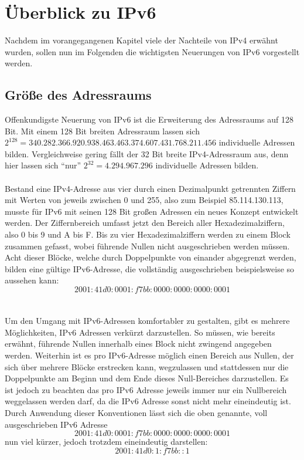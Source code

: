 \documentclass[a4paper,12pt]{scrartcl}
\begin{document}
\section{\"Uberblick zu IPv6}
Nachdem im vorangegangenen Kapitel viele der Nachteile von IPv4 erwähnt wurden, sollen nun im Folgenden die wichtigsten Neuerungen von IPv6 vorgestellt werden. 

\subsection{Gr\"o{\ss}e  des Adressraums}

Offenkundigste Neuerung von IPv6 ist die Erweiterung des Adressraums auf 128 Bit. Mit einem 128 Bit breiten Adressraum lassen sich \\
$2^{128} = 340.282.366.920.938.463.463.374.607.431.768.211.456$ individuelle Adressen bilden. Vergleichweise gering fällt der 32 Bit breite IPv4-Adressraum aus, denn hier lassen sich "`nur"' $2^{32} = 4.294.967.296$ individuelle Adressen bilden. \\
\\
Bestand eine IPv4-Adresse aus vier durch einen Dezimalpunkt getrennten Ziffern mit Werten von jeweils zwischen 0 und 255, also zum Beispiel 85.114.130.113, musste für IPv6 mit seinen 128 Bit großen Adressen ein neues Konzept entwickelt werden.
Der Ziffernbereich umfasst jetzt den Bereich aller Hexadezimalziffern, also 0 bis 9 und A bis F. Bis zu vier Hexadezimalziffern werden zu einem Block zusammen gefasst, wobei führende Nullen nicht ausgeschrieben werden m\"ussen. Acht dieser Blöcke, welche durch Doppelpunkte von einander abgegrenzt werden, bilden eine gültige IPv6-Adresse, die vollständig ausgeschrieben  beispielsweise so aussehen kann:  \[ 2001:41d0:0001:f7bb:0000:0000:0000:0001 \]\\
\\
Um den Umgang mit IPv6-Adressen komfortabler zu gestalten, gibt es mehrere Möglichkeiten, IPv6 Adressen verkürzt darzustellen. So müssen, wie bereits erwähnt, führende Nullen innerhalb eines Block nicht zwingend angegeben werden. Weiterhin ist es pro IPv6-Adresse möglich einen Bereich aus Nullen, der sich über mehrere Blöcke erstrecken kann, wegzulassen und stattdessen nur die Doppelpunkte am Beginn und dem Ende dieses Null-Bereiches darzustellen. Es ist jedoch zu beachten das pro IPv6 Adresse jeweils immer nur ein Nullbereich weggelassen werden darf, da die IPv6 Adresse sonst nicht mehr eineindeutig ist. Durch Anwendung dieser Konventionen lässt sich die oben genannte, voll ausgeschrieben IPv6 Adresse
\[ 2001:41d0:0001:f7bb:0000:0000:0000:0001 \]
nun viel kürzer, jedoch trotzdem eineindeutig darstellen:
 \[ 2001:41d0:1:f7bb::1 \]
 
\end{document}
